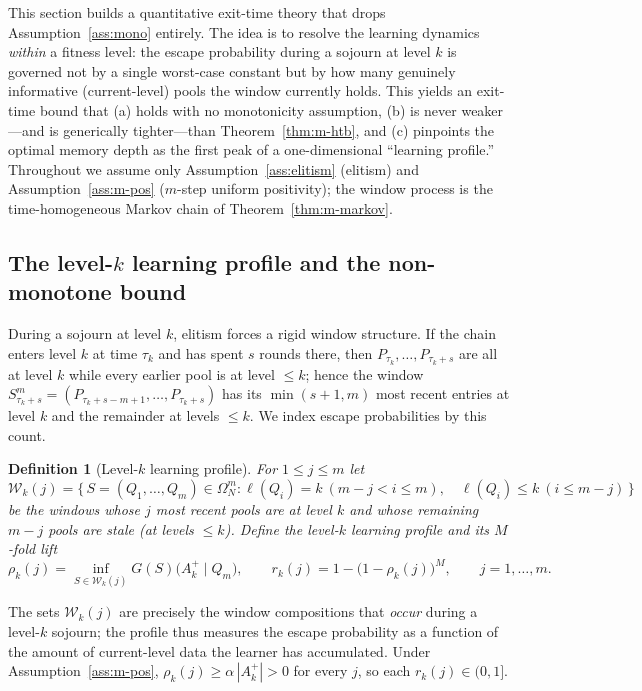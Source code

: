 \documentclass[11pt,a4paper]{article}
\newtheorem{definition}[theorem]{Definition}
\newcommand{\Omn}{\Omega_N}
\newcommand{\Akp}{A_k^{+}}
\begin{document}
This section builds a quantitative exit-time theory that drops
Assumption~\ref{ass:mono} entirely.  The idea is to resolve the learning
dynamics \emph{within} a fitness level: the escape probability during a
sojourn at level $k$ is governed not by a single worst-case constant but
by how many genuinely informative (current-level) pools the window
currently holds.  This yields an exit-time bound that (a) holds with no
monotonicity assumption, (b) is never weaker---and is generically
tighter---than Theorem~\ref{thm:m-htb}, and (c) pinpoints the optimal
memory depth as the first peak of a one-dimensional ``learning profile.''
Throughout we assume only Assumption~\ref{ass:elitism} (elitism) and
Assumption~\ref{ass:m-pos} ($m$-step uniform positivity); the window
process is the time-homogeneous Markov chain of Theorem~\ref{thm:m-markov}.

\subsection{The level-\texorpdfstring{$k$}{k} learning profile and the non-monotone bound}
\label{sec:nm-profile}

During a sojourn at level $k$, elitism forces a rigid window structure.
If the chain enters level $k$ at time $\tau_k$ and has spent $s$ rounds
there, then $P_{\tau_k},\dots,P_{\tau_k+s}$ are all at level $k$
while every earlier pool is at level $\le k$; hence the window
$S^m_{\tau_k+s}=(P_{\tau_k+s-m+1},\dots,P_{\tau_k+s})$ has its
$\min(s+1,m)$ most recent entries at level $k$ and the remainder at
levels $\le k$.  We index escape probabilities by this count.

\begin{definition}[Level-$k$ learning profile]\label{def:profile}
  For $1\le j\le m$ let
  \[
    \mathcal W_k(j)=\bigl\{\,S=(Q_1,\dots,Q_m)\in\Omn^m :
      \ell(Q_i)=k\ (m-j<i\le m),\quad \ell(Q_i)\le k\ (i\le m-j)\,\bigr\}
  \]
  be the windows whose $j$ most recent pools are at level $k$ and whose
  remaining $m-j$ pools are stale (at levels $\le k$).  Define the
  \emph{level-$k$ learning profile} and its $M$-fold lift
  \[
    \rho_k(j)=\inf_{S\in\mathcal W_k(j)} G(S)\bigl(\Akp\mid Q_m\bigr),
    \qquad
    r_k(j)=1-\bigl(1-\rho_k(j)\bigr)^M ,\qquad j=1,\dots,m .
  \]
\end{definition}

The sets $\mathcal W_k(j)$ are precisely the window compositions that
\emph{occur} during a level-$k$ sojourn; the profile thus measures the
escape probability as a function of the amount of current-level data the
learner has accumulated.  Under Assumption~\ref{ass:m-pos},
$\rho_k(j)\ge\alpha\,|\Akp|>0$ for every $j$, so each $r_k(j)\in(0,1]$.
\end{document}
